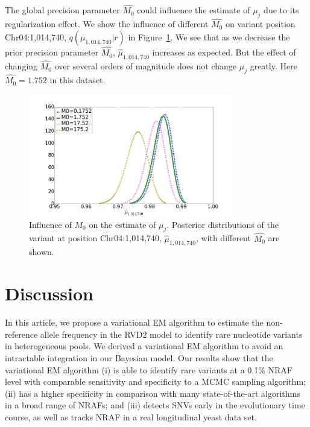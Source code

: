 \documentclass[11pt,reqno]{amsart}
\begin{document}
The global precision parameter $\hat{M_0}$ could influence the estimate of $\mu_j$ due to its regularization effect.
We show the influence of different $\hat{M_0}$ on variant position Chr04:1,014,740, $q(\mu_{1,014,740}|r)$ in Figure~\ref{tbl:M0}.
We see that as we decrease the prior precision parameter $\hat{M_0}$, $\hat{\mu}_{1,014,740}$ increases as expected.
But the effect of changing $\hat{M_0}$ over several orders of magnitude does not change $\mu_j$ greatly.
Here $\hat{M_0} = 1.752$ in this dataset.
\begin{figure}[htbp]
\centering
\includegraphics[width=0.8\textwidth]{figs/diff_M0.png}
\caption{Influence of $M_0$ on the estimate of $\mu_j$.
Posterior distributions of the variant at position Chr04:1,014,740, $\hat{\mu}_{1,014,740}$, with different $\hat{M_0}$ are shown.}
\label{tbl:M0}
\end{figure}

\section{Discussion}
In this article, we propose a variational EM algorithm to estimate the non-reference allele frequency in the RVD2 model to identify rare nucleotide variants in heterogeneous pools.
We derived a variational EM algorithm to avoid an intractable integration in our Bayesian model.
Our results show that the variational EM algorithm
(i) is able to identify rare variants at a 0.1\% NRAF level with comparable sensitivity and specificity to a MCMC sampling algorithm;
(ii) has a higher specificity in comparison with many state-of-the-art algorithms in a broad range of NRAFs;
and (iii) detects SNVs early in the evolutionary time course, as well as tracks NRAF in a real longitudinal yeast data set.
\end{document}
